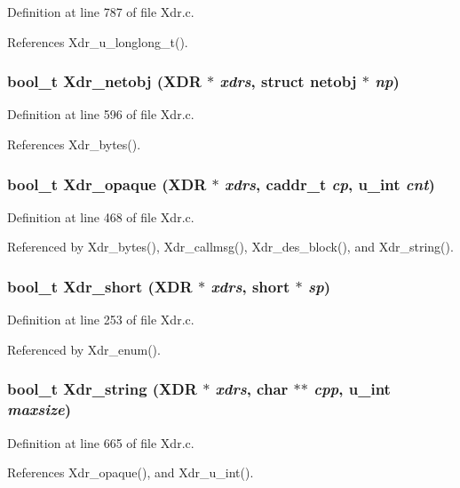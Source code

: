 Definition at line 787 of file Xdr.c.

References Xdr\_\-u\_\-longlong\_\-t().
\subsubsection{\setlength{\rightskip}{0pt plus 5cm}bool\_\-t Xdr\_\-netobj (XDR $\ast$ {\em xdrs}, struct netobj $\ast$ {\em np})}\label{Xdr_8c_a22}




Definition at line 596 of file Xdr.c.

References Xdr\_\-bytes().
\subsubsection{\setlength{\rightskip}{0pt plus 5cm}bool\_\-t Xdr\_\-opaque (XDR $\ast$ {\em xdrs}, caddr\_\-t {\em cp}, u\_\-int {\em cnt})}\label{Xdr_8c_a20}




Definition at line 468 of file Xdr.c.

Referenced by Xdr\_\-bytes(), Xdr\_\-callmsg(), Xdr\_\-des\_\-block(), and Xdr\_\-string().
\subsubsection{\setlength{\rightskip}{0pt plus 5cm}bool\_\-t Xdr\_\-short (XDR $\ast$ {\em xdrs}, short $\ast$ {\em sp})}\label{Xdr_8c_a12}




Definition at line 253 of file Xdr.c.

Referenced by Xdr\_\-enum().
\subsubsection{\setlength{\rightskip}{0pt plus 5cm}bool\_\-t Xdr\_\-string (XDR $\ast$ {\em xdrs}, char $\ast$$\ast$ {\em cpp}, u\_\-int {\em maxsize})}\label{Xdr_8c_a24}




Definition at line 665 of file Xdr.c.

References Xdr\_\-opaque(), and Xdr\_\-u\_\-int().

